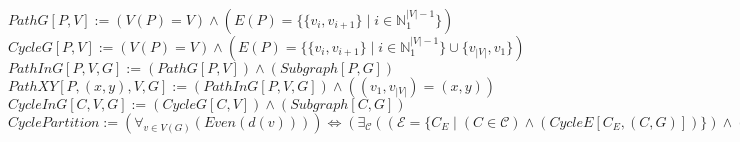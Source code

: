 \documentclass{book}
\newcommand{\abr}{:=}
\newcommand{\pr}[1]{\left(#1\right)}
\newcommand{\st}{\mathbin{|}}
\newcommand{\utup}[1]{\{#1\}}
\begin{document}
$PathG[P, V] \abr \pr{V(P) = V} \land \pr{E(P) = \{\utup{v_i, v_{i + 1}} \st i \in \mathbb{N}_1^{|V| - 1}\}}$ \\
$CycleG[P, V] \abr \pr{V(P) = V} \land \pr{E(P) = \{\utup{v_i, v_{i + 1}} \st i \in \mathbb{N}_1^{|V| - 1}\} \cup \{v_{|V|}, v_1\}}$ \\
$PathInG[P, V, G] \abr (PathG[P, V]) \land (Subgraph[P, G])$ \\
$PathXY[P, (x, y), V, G] \abr (PathInG[P, V, G]) \land \pr{(v_1, v_{|V|}) = (x, y)}$ \\
$CycleInG[C, V, G] \abr (CycleG[C, V]) \land (Subgraph[C, G])$ \\

$CyclePartition \abr \pr{\forall_{v \in V(G)}\pr{Even\pr{d(v)}}} \iff \pr{\exists_{\mathcal{C}}\pr{\pr{\mathcal{E} = \{C_E \st (C \in \mathcal{C}) \land \pr{CycleE[C_E, (C, G)]}\}} \land \pr{Partition[\mathcal{E}, E(G)]}}}$ \\
\end{document}
